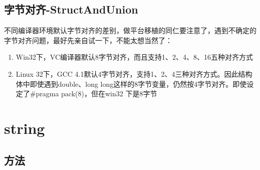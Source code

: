 \documentclass[UTF8,a4paper,12pt]{ctexbook} %
\begin{document}
	\section{字节对齐-StructAndUnion}
		不同编译器环境默认字节对齐的差别，做平台移植的同仁要注意了，遇到不确定的字节对齐问题，最好先亲自试一下，不能太想当然了：
		\begin{enumerate}
			\item Win32下，VC编译器默认8字节对齐，而且支持1、2、4、8、16五种对齐方式
			\item Linux 32下，GCC 4.1默认4字节对齐，支持1、2、4三种对齐方式。因此结构体中即使遇到double、long long这样的8字节变量，仍然按4字节对齐。即使设定了\#pragma pack(8)，但在win32 下是8字节
		\end{enumerate}	        
         
\chapter{string} 
	\section{方法}
\end{document}
